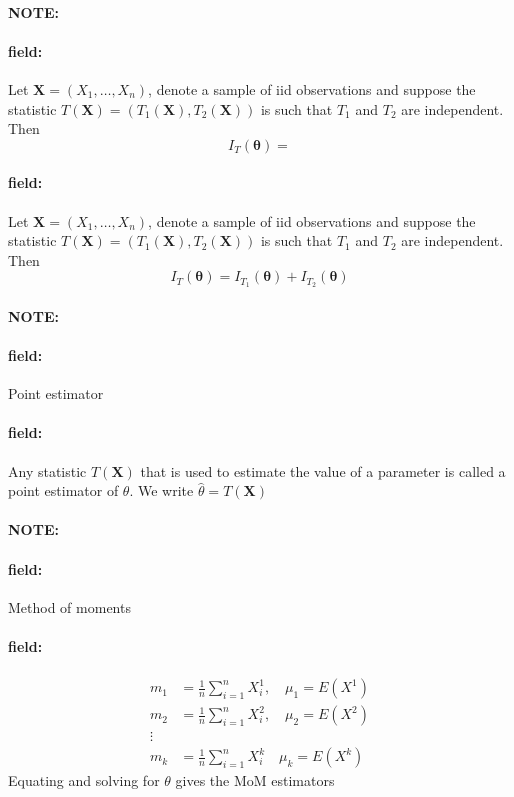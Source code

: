 \documentclass[12pt]{article}
\newenvironment{note}{\paragraph{NOTE:}}{}
\newenvironment{field}{\paragraph{field:}}{}
\begin{document}
\begin{note}
  \begin{field}
    Let $\mathbf{X} = (X_1, \ldots , X_n)$, denote a sample of iid observations and suppose the statistic $T(\mathbf{X}) = (T_1(\mathbf{X}), T_2(\mathbf{X}))$ is such that $T_1$ and $T_2$ are independent. Then $$ I_{T}(\boldsymbol\theta) = $$
  \end{field}
  \begin{field}
    Let $\mathbf{X} = (X_1, \ldots , X_n)$, denote a sample of iid observations and suppose the statistic $T(\mathbf{X}) = (T_1(\mathbf{X}), T_2(\mathbf{X}))$ is such that $T_1$ and $T_2$ are independent. Then $$ I_{T}(\boldsymbol\theta) = I_{T_1}(\boldsymbol\theta) + I_{T_2}(\boldsymbol\theta)$$
  \end{field}
\end{note}

\begin{note}
  \begin{field}
    Point estimator
  \end{field}
  \begin{field}
    Any statistic $T(\mathbf{X})$ that is used to estimate the value of a parameter is called a point estimator of $\theta$. We write $\hat{\theta} = T(\mathbf{X})$
  \end{field}
\end{note}

\begin{note}
  \begin{field}
    Method of moments
  \end{field}
  \begin{field}
    \begin{align*}
      m_1 &= \frac{1}{n}\sum _{i = 1}^n X_i^1, \quad \mu_1 = E(X^1)\\
      m_2 &= \frac{1}{n}\sum _{i = 1}^n X_i^2, \quad \mu_2 = E(X^2)\\
      \vdots & \\
      m_k &= \frac{1}{n} \sum _{i = 1}^n X_i^k \quad \mu_k = E(X^k)
    \end{align*}
    Equating and solving for $\theta$ gives the MoM estimators
  \end{field}
\end{note}
\end{document}

